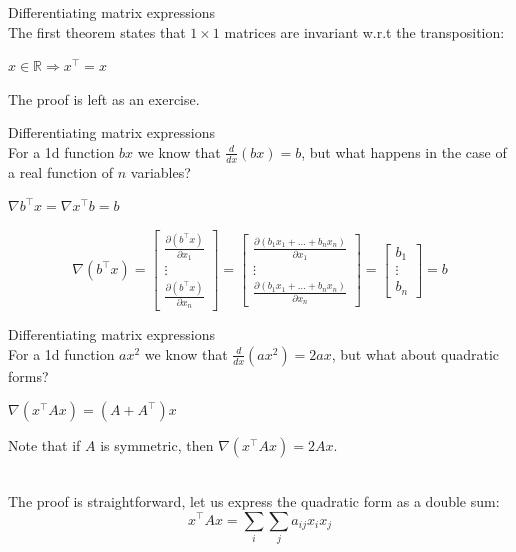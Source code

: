 \documentclass[UKenglish,aspectratio=169]{beamer}
\begin{document}
\begin{frame}{Differentiating matrix expressions}
~\\
The first theorem states that $1\times 1$ matrices are invariant w.r.t the transposition:
\begin{theorem}
$x\in \mathbb R \Rightarrow x^\top = x$
\end{theorem}
The proof is left as an exercise.
\end{frame}

\begin{frame}{Differentiating matrix expressions}
~\\
For a 1d function $bx$ we know that $\frac{d}{dx}(bx) = b$, but what happens in the case of a real function of $n$ variables?
\begin{theorem}
$\nabla b^\top x = \nabla x^\top b = b$
\end{theorem}
\pause
$$\nabla(b^\top x) = \begin{bmatrix}\frac{\partial (b^\top x)}{\partial x_1} \\ \vdots \\ \frac{\partial (b^\top x)}{\partial x_n} \end{bmatrix} = \begin{bmatrix}\frac{\partial (b_1 x_1 + \dots + b_n x_n)}{\partial x_1} \\ \vdots \\ \frac{\partial (b_1 x_1 + \dots + b_n x_n)}{\partial x_n} \end{bmatrix} = \begin{bmatrix}b_1 \\ \vdots \\ b_n \end{bmatrix} = b$$
\end{frame}

\begin{frame}{Differentiating matrix expressions}
~\\
For a 1d function $ax^2$ we know that $\frac{d}{dx}(ax^2) = 2ax$, but what about quadratic forms?
\begin{theorem}
$\nabla (x^\top A x) = (A+A^\top)x$
\end{theorem}
Note that if $A$ is symmetric, then $\nabla (x^\top A x) = 2Ax$.

~\\

The proof is straightforward, let us express the quadratic form as a double sum:
$$x^\top A x = \sum\limits_i\sum\limits_j a_{ij} x_i x_j$$
\end{frame}
\end{document}
